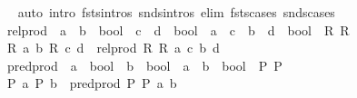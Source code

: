 \begin{isabellebody}
%
\isadelimproof
\ \ %
\endisadelimproof
%
\isatagproof
{}\isamarkupfalse%
\ {\isacharparenleft}{\kern0pt}auto\ intro{\isacharcolon}{\kern0pt}\ fsts{\isachardot}{\kern0pt}intros\ snds{\isachardot}{\kern0pt}intros\ elim{\isacharcolon}{\kern0pt}\ fsts{\isachardot}{\kern0pt}cases\ snds{\isachardot}{\kern0pt}cases{\isacharparenright}{\kern0pt}%
\endisatagproof
{\isafoldproof}%
%
\isadelimproof
\isanewline
%
\endisadelimproof
\isanewline
{}\isamarkupfalse%
\isanewline
\ \ rel{\isacharunderscore}{\kern0pt}prod\ {\isacharcolon}{\kern0pt}{\isacharcolon}{\kern0pt}\ {\isachardoublequoteopen}{\isacharparenleft}{\kern0pt}{\isacharprime}{\kern0pt}a\ {\isasymRightarrow}\ {\isacharprime}{\kern0pt}b\ {\isasymRightarrow}\ bool{\isacharparenright}{\kern0pt}\ {\isasymRightarrow}\ {\isacharparenleft}{\kern0pt}{\isacharprime}{\kern0pt}c\ {\isasymRightarrow}\ {\isacharprime}{\kern0pt}d\ {\isasymRightarrow}\ bool{\isacharparenright}{\kern0pt}\ {\isasymRightarrow}\ {\isacharprime}{\kern0pt}a\ {\isasymtimes}\ {\isacharprime}{\kern0pt}c\ {\isasymRightarrow}\ {\isacharprime}{\kern0pt}b\ {\isasymtimes}\ {\isacharprime}{\kern0pt}d\ {\isasymRightarrow}\ bool{\isachardoublequoteclose}\ \ R{}\ R{}\isanewline
{}\isanewline
\ \ {\isachardoublequoteopen}{\isasymlbrakk}R{}\ a\ b{\isacharsemicolon}{\kern0pt}\ R{}\ c\ d{\isasymrbrakk}\ {\isasymLongrightarrow}\ rel{\isacharunderscore}{\kern0pt}prod\ R{}\ R{}\ {\isacharparenleft}{\kern0pt}a{\isacharcomma}{\kern0pt}\ c{\isacharparenright}{\kern0pt}\ {\isacharparenleft}{\kern0pt}b{\isacharcomma}{\kern0pt}\ d{\isacharparenright}{\kern0pt}{\isachardoublequoteclose}\isanewline
\isanewline
{}\isamarkupfalse%
\isanewline
\ \ pred{\isacharunderscore}{\kern0pt}prod\ {\isacharcolon}{\kern0pt}{\isacharcolon}{\kern0pt}\ {\isachardoublequoteopen}{\isacharparenleft}{\kern0pt}{\isacharprime}{\kern0pt}a\ {\isasymRightarrow}\ bool{\isacharparenright}{\kern0pt}\ {\isasymRightarrow}\ {\isacharparenleft}{\kern0pt}{\isacharprime}{\kern0pt}b\ {\isasymRightarrow}\ bool{\isacharparenright}{\kern0pt}\ {\isasymRightarrow}\ {\isacharprime}{\kern0pt}a\ {\isasymtimes}\ {\isacharprime}{\kern0pt}b\ {\isasymRightarrow}\ bool{\isachardoublequoteclose}\ \ P{}\ P{}\isanewline
{}\isanewline
\ \ {\isachardoublequoteopen}{\isasymlbrakk}P{}\ a{\isacharsemicolon}{\kern0pt}\ P{}\ b{\isasymrbrakk}\ {\isasymLongrightarrow}\ pred{\isacharunderscore}{\kern0pt}prod\ P{}\ P{}\ {\isacharparenleft}{\kern0pt}a{\isacharcomma}{\kern0pt}\ b{\isacharparenright}{\kern0pt}{\isachardoublequoteclose}\isanewline

\end{isabellebody}
